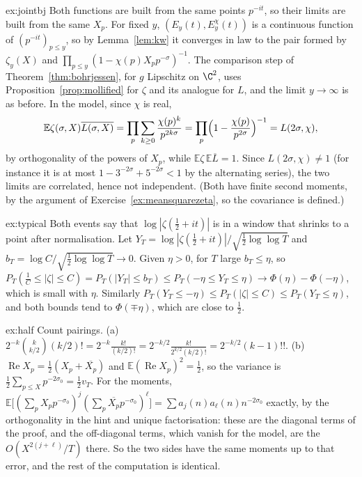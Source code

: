 \begin{solution}{ex:jointbj}
\idea Both functions are built from the same points $p^{-it}$, so their limits are built from the same $X_p$.
\writeup For fixed $y$, $(E_y(t),E_y^\chi(t))$ is a continuous function of $(p^{-it})_{p\le y}$, so by Lemma~\ref{lem:kw} it converges in law to the pair formed by $\zeta_y(X)$ and $\prod_{p\le y}(1-\chi(p)X_pp^{-\sigma})^{-1}$. The comparison step of Theorem~\ref{thm:bohrjessen}, for $g$ Lipschitz on $\C^2$, uses Proposition~\ref{prop:mollified} for $\zeta$ and its analogue for $L$, and the limit $y\to\infty$ is as before. In the model, since $\chi$ is real,
\[
\mathbb E\zeta(\sigma,X)\overline{L(\sigma,X)}=\prod_p\sum_{k\ge0}\frac{\chi(p)^k}{p^{2k\sigma}}=\prod_p\Bigl(1-\frac{\chi(p)}{p^{2\sigma}}\Bigr)^{-1}=L(2\sigma,\chi),
\]
by orthogonality of the powers of $X_p$, while $\mathbb E\zeta\,\mathbb E\overline L=1$. Since $L(2\sigma,\chi)\ne1$ (for instance it is at most $1-3^{-2\sigma}+5^{-2\sigma}<1$ by the alternating series), the two limits are correlated, hence not independent. (Both have finite second moments, by the argument of Exercise~\ref{ex:meansquarezeta}, so the covariance is defined.)
\end{solution}

\begin{solution}{ex:typical}
\idea Both events say that $\log|\zeta(\frac12+it)|$ is in a window that shrinks to a point after normalisation.
\writeup Let $Y_T=\log|\zeta(\frac12+it)|/\sqrt{\frac12\log\log T}$ and $b_T=\log C/\sqrt{\frac12\log\log T}\to0$. Given $\eta>0$, for $T$ large $b_T\le\eta$, so $P_T(\frac1C\le|\zeta|\le C)=P_T(|Y_T|\le b_T)\le P_T(-\eta\le Y_T\le\eta)\to\Phi(\eta)-\Phi(-\eta)$, which is small with $\eta$. Similarly $P_T(Y_T\le-\eta)\le P_T(|\zeta|\le C)\le P_T(Y_T\le\eta)$, and both bounds tend to $\Phi(\mp\eta)$, which are close to $\frac12$.
\end{solution}

\begin{solution}{ex:half}
\idea Count pairings.
\writeup (a) $2^{-k}\binom k{k/2}(k/2)!=2^{-k}\frac{k!}{(k/2)!}=2^{-k/2}\frac{k!}{2^{k/2}(k/2)!}=2^{-k/2}(k-1)!!$. (b) $\operatorname{Re}X_p=\frac12(X_p+\overline{X_p})$ and $\mathbb E(\operatorname{Re}X_p)^2=\frac12$, so the variance is $\frac12\sum_{p\le X}p^{-2\sigma_0}=\frac12v_T$. For the moments, $\mathbb E\bigl[(\sum_pX_pp^{-\sigma_0})^j(\sum_p\overline{X_p}p^{-\sigma_0})^\ell\bigr]=\sum a_j(n)a_\ell(n)n^{-2\sigma_0}$ exactly, by the orthogonality in the hint and unique factorisation: these are the diagonal terms of the proof, and the off-diagonal terms, which vanish for the model, are the $O(X^{2(j+\ell)}/T)$ there. So the two sides have the same moments up to that error, and the rest of the computation is identical.
\end{solution}

